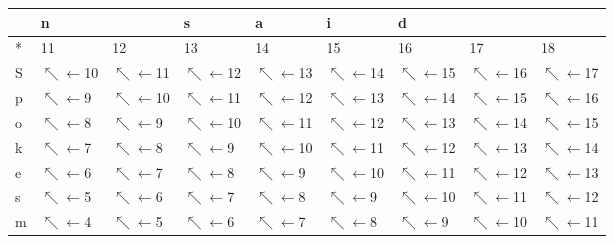 \begin{tabular}{lllllllll}
\toprule
{} & \multicolumn{2}{l}{n} &                               s &                               a &                               i & \multicolumn{3}{l}{d} \\
\midrule
* &                      11 &                      12 &                              13 &                              14 &                              15 &                              16 &                              17 &                              18 \\
S &  $\nwarrow\leftarrow$10 &  $\nwarrow\leftarrow$11 &          $\nwarrow\leftarrow$12 &          $\nwarrow\leftarrow$13 &          $\nwarrow\leftarrow$14 &          $\nwarrow\leftarrow$15 &          $\nwarrow\leftarrow$16 &          $\nwarrow\leftarrow$17 \\
p &   $\nwarrow\leftarrow$9 &  $\nwarrow\leftarrow$10 &          $\nwarrow\leftarrow$11 &          $\nwarrow\leftarrow$12 &          $\nwarrow\leftarrow$13 &          $\nwarrow\leftarrow$14 &          $\nwarrow\leftarrow$15 &          $\nwarrow\leftarrow$16 \\
o &   $\nwarrow\leftarrow$8 &   $\nwarrow\leftarrow$9 &          $\nwarrow\leftarrow$10 &          $\nwarrow\leftarrow$11 &          $\nwarrow\leftarrow$12 &          $\nwarrow\leftarrow$13 &          $\nwarrow\leftarrow$14 &          $\nwarrow\leftarrow$15 \\
k &   $\nwarrow\leftarrow$7 &   $\nwarrow\leftarrow$8 &           $\nwarrow\leftarrow$9 &          $\nwarrow\leftarrow$10 &          $\nwarrow\leftarrow$11 &          $\nwarrow\leftarrow$12 &          $\nwarrow\leftarrow$13 &          $\nwarrow\leftarrow$14 \\
e &   $\nwarrow\leftarrow$6 &   $\nwarrow\leftarrow$7 &           $\nwarrow\leftarrow$8 &           $\nwarrow\leftarrow$9 &          $\nwarrow\leftarrow$10 &          $\nwarrow\leftarrow$11 &          $\nwarrow\leftarrow$12 &          $\nwarrow\leftarrow$13 \\
s &   $\nwarrow\leftarrow$5 &   $\nwarrow\leftarrow$6 &           $\nwarrow\leftarrow$7 &           $\nwarrow\leftarrow$8 &           $\nwarrow\leftarrow$9 &          $\nwarrow\leftarrow$10 &          $\nwarrow\leftarrow$11 &          $\nwarrow\leftarrow$12 \\
m &   $\nwarrow\leftarrow$4 &   $\nwarrow\leftarrow$5 &           $\nwarrow\leftarrow$6 &           $\nwarrow\leftarrow$7 &           $\nwarrow\leftarrow$8 &           $\nwarrow\leftarrow$9 &          $\nwarrow\leftarrow$10 &          $\nwarrow\leftarrow$11 \\

\end{tabular}
